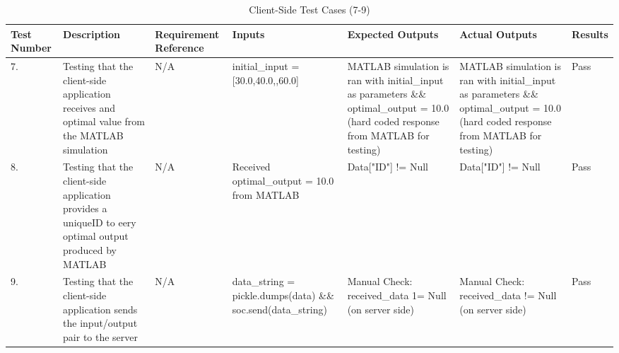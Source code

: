 \documentclass[12pt, titlepage]{article}
\begin{document}
\begin{center}
    \begin{table}[H]
        \centering
        \begin{tabular}{|p{1cm}|p{2.2cm}|p{2.5cm}|p{2.7cm}|p{2.4cm}|p{2.4cm}|p{1.3cm}|}
        \hline
        \bf Test Number & \bf Description & \bf Requirement Reference & \bf Inputs & \bf Expected Outputs & \bf Actual Outputs & \bf Results \\
        \hline
        7. & Testing that the client-side application receives and optimal value from the MATLAB simulation & N/A & initial\_input = [30.0,40.0,\newline50.0,60.0] & MATLAB simulation is ran with initial\_input as parameters \&\& optimal\_output = 10.0 (hard coded response from MATLAB for testing) & MATLAB simulation is ran with initial\_input as parameters \&\& optimal\_output = 10.0 (hard coded response from MATLAB for testing) & Pass\\
        \hline
        8. & Testing that the client-side application provides a uniqueID to eery optimal output produced by MATLAB & N/A & Received optimal\_output = 10.0 from MATLAB & Data["ID"] != Null & Data["ID"] != Null & Pass\\
        \hline
        9. & Testing that the client-side application sends the input/output pair to the server & N/A & data\_string = pickle.\newline dumps(data) \&\& soc.\newline send(data\_\newline string) & Manual Check: received\_data 1= Null (on server side) & Manual Check: received\_data != Null (on server side) & Pass\\
        \hline
        \end{tabular}
        \caption{Client-Side Test Cases (7-9)}
        \label{tab:my_label9}
    \end{table}
\end{center}
\end{document}
